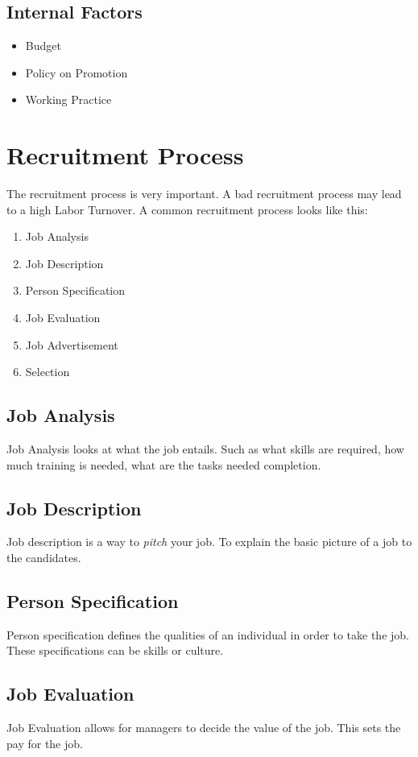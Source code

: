 \documentclass{report}
\begin{document}
\subsection{Internal Factors}
\begin{itemize}
	\item Budget
	\item Policy on Promotion
	\item Working Practice
\end{itemize}

\section{Recruitment Process}
The recruitment process is very important.
A bad recruitment process may lead to a high Labor Turnover.
A common recruitment process looks like this: 
\begin{enumerate}
	\item Job Analysis
	\item Job Description
	\item Person Specification
	\item Job Evaluation
	\item Job Advertisement
	\item Selection
\end{enumerate}

\subsection{Job Analysis}
Job Analysis looks at what the job entails.
Such as what skills are required, how much training is needed, what are the tasks needed completion.

\subsection{Job Description}
Job description is a way to \textit{pitch} your job.
To explain the basic picture of a job to the candidates.

\subsection{Person Specification}
Person specification defines the qualities of an individual in order to take the job.
These specifications can be skills or culture.

\subsection{Job Evaluation}
Job Evaluation allows for managers to decide the value of the job.
This sets the pay for the job.
\end{document}
